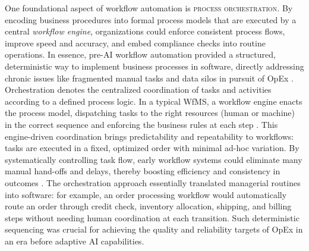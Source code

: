 One foundational aspect of workflow automation is \textsc{process orchestration}. By encoding business procedures into formal process models that are executed by a central \emph{workflow engine}, organizations could enforce consistent process flows, improve speed and accuracy, and embed compliance checks into routine operations. In essence, pre-AI workflow automation provided a structured, deterministic way to implement business processes in software, directly addressing chronic issues like fragmented manual tasks and data silos in pursuit of OpEx \parencite{basuResearch2002}. Orchestration denotes the centralized coordination of tasks and activities according to a defined process logic. In a typical WfMS, a workflow engine enacts the process model, dispatching tasks to the right resources (human or machine) in the correct sequence and enforcing the business rules at each step \parencite{basuResearch2002}. This engine-driven coordination brings predictability and repeatability to workflows: tasks are executed in a fixed, optimized order with minimal ad-hoc variation. By systematically controlling task flow, early workflow systems could eliminate many manual hand-offs and delays, thereby boosting efficiency and consistency in outcomes \parencite{stohrWorkflow2001}. The orchestration approach essentially translated managerial routines into software: for example, an order processing workflow would automatically route an order through credit check, inventory allocation, shipping, and billing steps without needing human coordination at each transition. Such deterministic sequencing was crucial for achieving the quality and reliability targets of OpEx in an era before adaptive AI capabilities.

